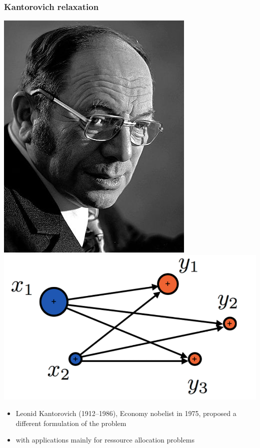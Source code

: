 \documentclass[french,9pt]{beamer}
\begin{document}
\begin{frame}
  \frametitle{Kantorovich relaxation}
  \begin{center}
      \includegraphics[width=0.3\linewidth]{fig/kanto} \includegraphics[width=0.6\linewidth]{fig/alloc}
  \end{center}
\begin{itemize}
\item Leonid Kantorovich (1912--1986), Economy nobelist in 1975, proposed a different formulation of the problem
\item with applications mainly for ressource allocation problems
\end{itemize}
\end{frame}
\end{document}

